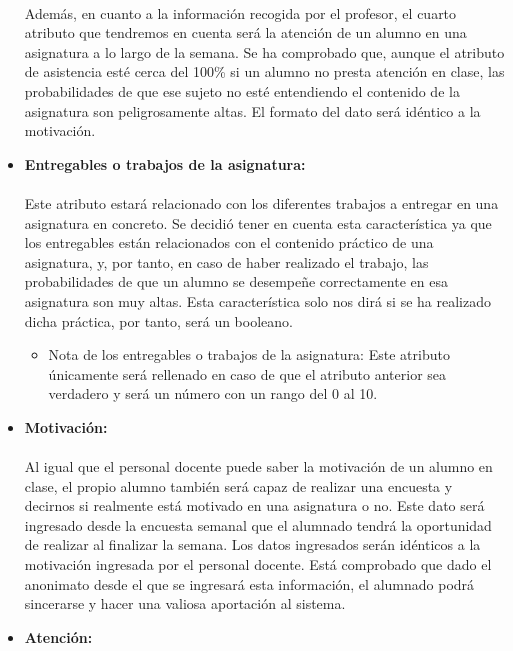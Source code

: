 \begin{itemize}
\paragraph{}
Además, en cuanto a la información recogida por el profesor, el cuarto
atributo que tendremos en cuenta será la atención de un alumno en una
asignatura a lo largo de la semana. Se ha comprobado que, aunque el
atributo de asistencia esté cerca del 100\% si un alumno no presta
atención en clase, las probabilidades de que ese sujeto no esté
entendiendo el contenido de la asignatura son peligrosamente altas. El
formato del dato será idéntico a la motivación.
\item \textbf{Entregables o trabajos de la asignatura:}
\paragraph{}
Este atributo estará relacionado con los diferentes trabajos a
entregar en una asignatura en concreto. Se decidió tener en cuenta
esta característica ya que los entregables están relacionados con el
contenido práctico de una asignatura, y, por tanto, en caso de haber
realizado el trabajo, las probabilidades de que un alumno se desempeñe
correctamente en esa asignatura son muy altas. Esta característica
solo nos dirá si se ha realizado dicha práctica, por tanto, será un
booleano.
\begin{itemize}
\item{Nota de los entregables o trabajos de la asignatura:} Este
  atributo únicamente será rellenado en caso de que el atributo
  anterior sea verdadero y será un número con un rango del 0 al 10.
\end{itemize}
\item \textbf{Motivación:}
\paragraph{}
Al igual que el personal docente puede saber la motivación de un
alumno en clase, el propio alumno también será capaz de realizar una
encuesta y decirnos si realmente está motivado en una asignatura o
no. Este dato será ingresado desde la encuesta semanal que el alumnado
tendrá la oportunidad de realizar al finalizar la semana. Los datos
ingresados serán idénticos a la motivación ingresada por el personal
docente. Está comprobado que dado el anonimato desde el que se
ingresará esta información, el alumnado podrá sincerarse y hacer una
valiosa aportación al sistema.
\item \textbf{Atención:}

\end{itemize}
